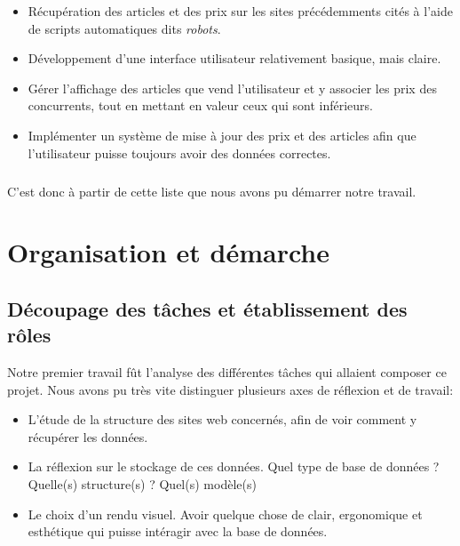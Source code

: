 \documentclass{report}
\begin{document}
\begin{itemize}
\item Récupération des articles et des prix sur les sites précédemments cités à l'aide de scripts automatiques dits \textit{robots}.
\item Développement d'une interface utilisateur relativement basique, mais claire.
\item Gérer l'affichage des articles que vend l'utilisateur et y associer les prix des concurrents, tout en mettant en valeur ceux qui sont inférieurs.
\item Implémenter un système de mise à jour des prix et des articles afin que l'utilisateur puisse toujours avoir des données correctes.
\end{itemize}

\paragraph{}
C'est donc à partir de cette liste que nous avons pu démarrer notre travail.

\chapter{Organisation et démarche}

\section{Découpage des tâches et établissement des rôles}
Notre premier travail fût l'analyse des différentes tâches qui allaient composer ce projet. Nous avons pu très vite distinguer plusieurs axes de réflexion et de travail:

\begin{itemize}
\item L'étude de la structure des sites web concernés, afin de voir comment y récupérer les données.
\item La réflexion sur le stockage de ces données. Quel type de base de données ? Quelle(s) structure(s) ? Quel(s) modèle(s)
\item Le choix d'un rendu visuel. Avoir quelque chose de clair, ergonomique et esthétique qui puisse intéragir avec la base de données.
\end{itemize}
\end{document}
